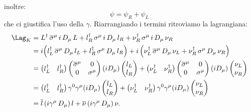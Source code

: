 inoltre:
\begin{equation}
    \psi = \psi_R + \psi_L
\end{equation}
che ci giustifica l'uso della $\gamma$. Riarrangiando i termini ritroviamo la lagrangiana:
\begin{align}
    \Lag_K &= L^\dagger\, \overline{\sigma}^\mu\, i\, D_\mu\, L + l_R^\dagger\, \sigma^\mu\, i\, D_\mu\, l_R + \nu_R^\dagger\, \sigma^\mu\, i\, D_\mu\, \nu_R \\
    &= i\Big( l_L^\dagger\, \overline{\sigma}^\mu\, D_\mu\, l_L + l_R^\dagger\, \sigma^\mu\, D_\mu\, l_R \Big) + i\, \Big( \nu_L^\dagger\, \overline{\sigma}^\mu\, D_\mu\, \nu_L + \nu_R^\dagger\, \sigma^\mu\, D_\mu\, \nu_R \Big) \\
    &= \begin{pmatrix}
        l_L^\dagger & l_R^\dagger
    \end{pmatrix} \begin{pmatrix}
        \overline{\sigma}^\mu & 0 \\
        0 & \sigma^\mu
    \end{pmatrix} (iD_\mu) \begin{pmatrix}
        l_L \\
        l_R
    \end{pmatrix} + \begin{pmatrix}
        \nu_L^\dagger & \nu_R^\dagger
    \end{pmatrix} \begin{pmatrix}
        \overline{\sigma}^\mu & 0 \\
        0 & \sigma^\mu
    \end{pmatrix} (iD_\mu) \begin{pmatrix}
        \nu_L \\
        \nu_R
    \end{pmatrix} \\
    &= \begin{pmatrix}
        l_L^\dagger & l_R^\dagger
    \end{pmatrix} \gamma^0 \gamma^\mu (iD_\mu) \begin{pmatrix}
        l_L \\
        l_R
    \end{pmatrix} + \begin{pmatrix}
        \nu_L^\dagger & \nu_R^\dagger
    \end{pmatrix} \gamma^0 \gamma^\mu (iD_\mu) \begin{pmatrix}
        \nu_L \\
        \nu_R
    \end{pmatrix} \\
    &= \overline{l}\, (i\gamma^\mu\, D_\mu)\, l + \overline{\nu}\, (i\gamma^\mu\, D_\mu)\, \nu.
\end{align}





